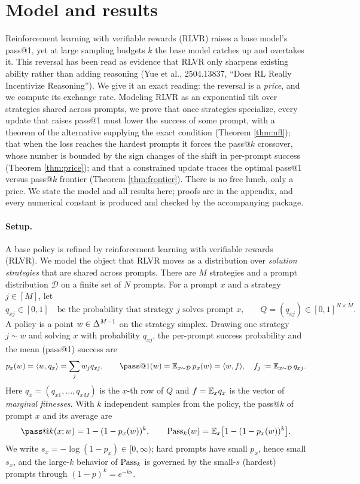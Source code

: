 \section{Model and results}
\label{sec:model}

Reinforcement learning with verifiable rewards (RLVR) raises a base model's
pass@1, yet at large sampling budgets $k$ the base model catches up and
overtakes it. This reversal has been read as evidence that RLVR only sharpens
existing ability rather than adding reasoning (Yue et al., 2504.13837, ``Does
RL Really Incentivize Reasoning''). We give it an exact reading: the reversal is
a \emph{price}, and we compute its exchange rate. Modeling RLVR as an
exponential tilt over strategies shared across prompts, we prove that once
strategies specialize, every update that raises pass@1 must lower the success of
some prompt, with a theorem of the alternative supplying the exact condition (Theorem
\ref{thm:nfl}); that when the loss reaches the hardest prompts it forces the
pass@$k$ crossover, whose number is bounded by the sign changes of the shift in
per-prompt success (Theorem \ref{thm:price}); and that a constrained update
traces the optimal pass@1 versus pass@$k$ frontier (Theorem \ref{thm:frontier}).
There is no free lunch, only a price. We state the model and all results here;
proofs are in the appendix, and every numerical constant is produced and checked
by the accompanying package.

\paragraph{Setup.}
A base policy is refined by reinforcement learning with verifiable rewards
(RLVR). We model the object that RLVR moves as a distribution over
\emph{solution strategies} that are shared across prompts. There are $M$
strategies and a prompt distribution $\mathcal{D}$ on a finite set of $N$
prompts. For a prompt $x$ and a strategy $j\in[M]$, let
\begin{equation}
q_{xj}\in[0,1]
\quad\text{be the probability that strategy $j$ solves prompt $x$,}
\qquad Q=(q_{xj})\in[0,1]^{N\times M}.
\end{equation}
A policy is a point $w\in\Delta^{M-1}$ on the strategy simplex. Drawing one strategy
$j\sim w$ and solving $x$ with probability $q_{xj}$, the per-prompt success
probability and the mean (pass@1) success are
\begin{equation}
p_x(w)=\inner{w}{q_x}=\sum_{j}w_j q_{xj},
\qquad
\pass@1(w)=\E_{x\sim\mathcal{D}}\,p_x(w)=\inner{w}{f},
\quad
f_j:=\E_{x\sim\mathcal{D}}\,q_{xj}.
\end{equation}
Here $q_x=(q_{x1},\dots,q_{xM})$ is the $x$-th row of $Q$ and $f=\mathbb{E}_x q_x$ is the
vector of \emph{marginal fitnesses}. With $k$ independent samples from the
policy, the pass@$k$ of prompt $x$ and its average are
\begin{equation}
\pass@k(x;w)=1-(1-p_x(w))^k,
\qquad
\PassK_k(w)=\E_{x}\big[1-(1-p_x(w))^k\big].
\end{equation}
We write $s_x=-\log(1-p_x)\in[0,\infty)$; hard prompts have small $p_x$, hence
small $s_x$, and the large-$k$ behavior of $\mathrm{Pass}_k$ is governed by the small-$s$
(hardest) prompts through $(1-p)^k=e^{-ks}$.

